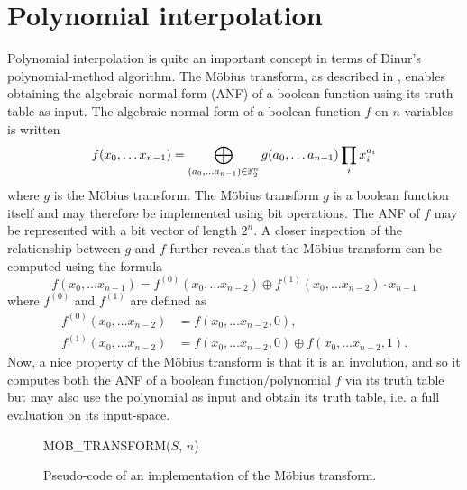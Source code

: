 \section{Polynomial interpolation} \label{sec:prereq:poly_interp}
Polynomial interpolation is quite an important concept in terms of Dinur's polynomial-method algorithm. The Möbius transform, as described in \cite{joux2009algorithmic}, enables obtaining the algebraic normal form (ANF) of a boolean function using its truth table as input. The algebraic normal form of a boolean function $f$ on $n$ variables is written
$$
    f(x_0, \dots x_{n - 1}) = \bigoplus_{(a_0,\dots a_{n - 1}) \in \mathbb{F}_2^n} g(a_0, \dots a_{n - 1}) \prod_i x_i^{a_i}
$$
where $g$ is the Möbius transform. The Möbius transform $g$ is a boolean function itself and may therefore be implemented using bit operations. The ANF of $f$ may be represented with a bit vector of length $2^n$. A closer inspection of the relationship between $g$ and $f$ further reveals that the Möbius transform can be computed using the formula
$$
    f(x_0, \dots x_{n - 1}) = f^{(0)}(x_0, \dots x_{n - 2}) \oplus f^{(1)}(x_0, \dots x_{n - 2}) \cdot x_{n - 1}
$$
where $f^{(0)}$ and $f^{(1)}$ are defined as 
\begin{equation*}
    \begin{split}
        f^{(0)}(x_0, \dots x_{n - 2}) &= f(x_0, \dots x_{n - 2}, 0), \\
        f^{(1)}(x_0, \dots x_{n - 2}) &= f(x_0, \dots x_{n - 2}, 0) \oplus f(x_0, \dots x_{n - 2}, 1).
    \end{split}
\end{equation*}
Now, a nice property of the Möbius transform is that it is an involution, and so it computes both the ANF of a boolean function/polynomial $f$ via its truth table but may also use the polynomial as input and obtain its truth table, i.e. a full evaluation on its input-space.

\begin{figure}[t]
    \begin{alg}
        \caption{MOB\_TRANSFORM($S$, $n$)}
    \end{alg}
    \caption{Pseudo-code of an implementation of the Möbius transform.}
    \label{alg:mob}
\end{figure}

